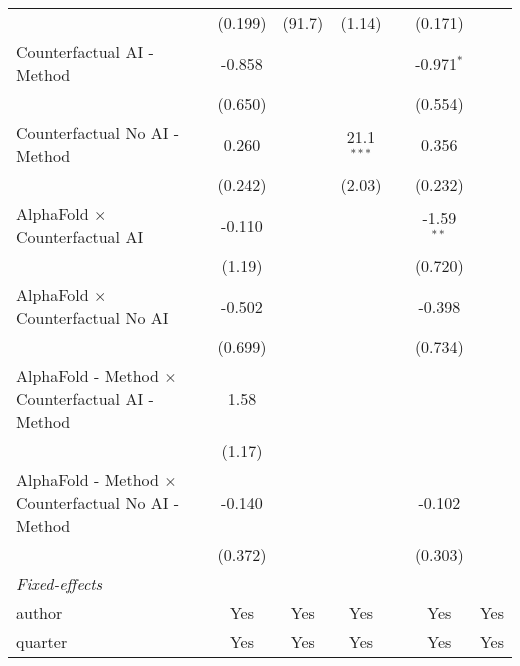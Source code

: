 \begin{tabular}{lcccccc}
                                                              & (0.199)  & (91.7)        & (1.14)       &      & (0.171)      &   \\   
   Counterfactual AI - Method                                 & -0.858   &               &              &      & -0.971$^{*}$ &   \\   
                                                              & (0.650)  &               &              &      & (0.554)      &   \\   
   Counterfactual No AI - Method                              & 0.260    &               & 21.1$^{***}$ &      & 0.356        &   \\   
                                                              & (0.242)  &               & (2.03)       &      & (0.232)      &   \\   
   AlphaFold $\times$ Counterfactual AI                       & -0.110   &               &              &      & -1.59$^{**}$ &   \\   
                                                              & (1.19)   &               &              &      & (0.720)      &   \\   
   AlphaFold $\times$ Counterfactual No AI                    & -0.502   &               &              &      & -0.398       &   \\   
                                                              & (0.699)  &               &              &      & (0.734)      &   \\   
   AlphaFold - Method $\times$ Counterfactual AI - Method     & 1.58     &               &              &      &              &   \\   
                                                              & (1.17)   &               &              &      &              &   \\   
   AlphaFold - Method $\times$ Counterfactual No AI - Method  & -0.140   &               &              &      & -0.102       &   \\   
                                                              & (0.372)  &               &              &      & (0.303)      &   \\   
   \midrule
   \emph{Fixed-effects}\\
   author                                                     & Yes      & Yes           & Yes          &      & Yes          & Yes\\  
   quarter                                                    & Yes      & Yes           & Yes          &      & Yes          & Yes\\  

\end{tabular}
